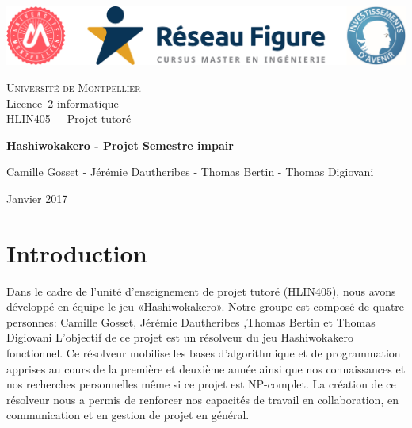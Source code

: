 \documentclass{article}
\begin{document}
\begin{titlepage}
  \begin{center}
    \includegraphics[scale=0.45]{logos.png}
    \vspace{1.5cm}
    
    \textsc{\LARGE Université de Montpellier}\\
    Licence~2 informatique\\
    HLIN405~--~Projet tutoré
    
    \vfill
    

 
    { \huge \bfseries Hashiwokakero - Projet Semestre impair \\[0.4cm] }

    \HRule
    \vfill
    
    
    \vfill

    \begin{minipage}{0.9\textwidth}

        Camille Gosset - Jérémie Dautheribes - Thomas Bertin - Thomas Digiovani
      
    \end{minipage}

    \vfill

    {\large Janvier 2017}
  \end{center}
\end{titlepage}



\section{\LARGE Introduction}
\hspace{0.5cm} Dans le cadre de l'unité d'enseignement de projet tutoré (HLIN405), nous avons développé en équipe le jeu «Hashiwokakero». Notre groupe est composé de quatre personnes: Camille Gosset, Jérémie Dautheribes ,Thomas Bertin et Thomas Digiovani
L’objectif de ce projet est un résolveur du jeu Hashiwokakero fonctionnel. Ce résolveur mobilise les bases d’algorithmique et de programmation apprises au cours de la première et deuxième année ainsi que nos connaissances et nos recherches personnelles même si ce projet est NP-complet. La création de ce résolveur nous a permis de renforcer nos capacités de travail en collaboration, en communication et en gestion de projet en général.
\end{document}
